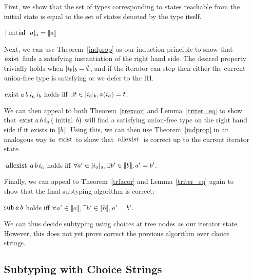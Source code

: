 \documentclass[a4paper,english]{lipics-v2019}
\newcommand{\denotes}[1]{\llbracket #1 \rrbracket}
\renewcommand{\c}[1]{\ensuremath{\text{\lstinline{#1}}}\xspace}
\begin{document}
First, we show that the set of types corresponding to states reachable from
the initial state is equal to the  set of states denoted by the type itself.

\begin{lemma}\label{triter_eq}
$\irch{\c{initial}~a}{a} = \denotes{\c a}$    
\end{lemma}

Next, we can use Theorem~\ref{indprop} as our induction principle to show that
\c{exist} finds a satisfying instantiation of the right hand side. The desired
property trivially holds when $|i_b|_{b} = \emptyset$, and if the iterator can
step then either the current union-free type is satisfying or we defer to the
IH.

\begin{theorem}\label{trexcor}
$\c{exist}\,a\,b\,i_a\,i_b$ holds iff $\exists t\in|i_b|_{b},a(i_a)= t$.
\end{theorem}

We can then appeal to both Theorem~\ref{trexcor} and Lemma~\ref{triter_eq}
to show that $\c{exist}\,a\,b\,i_a\,(\c{initial}\,b)$ will find a satisfying
union-free type on the right hand side if it exists in $\denotes{b}$. Using
this, we can then use Theorem~\ref{indprop} in an analogous way to \c{exist}
to show that \c{allexist} is correct up to the current iterator state.

\begin{theorem}\label{trfacor}
$\c{allexist}\,a\,b\,i_a$ holds iff $\forall a'\in \irch{i_a}{a},
  \exists b'\in \denotes{b}, a'= b'$.
\end{theorem}

Finally, we can appeal to Theorem~\ref{trfacor} and Lemma~\ref{triter_eq}
again to show that the final subtyping algorithm is correct:

\begin{theorem}\label{trsub}
$\c{sub}\,a\,b$ holds iff $\forall a' \in \denotes{a}, \exists b' \in
  \denotes{b}, a' = b'$.
\end{theorem}

We can thus decide subtyping using choices at tree nodes as our iterator
state.  However, this does not yet prove correct the previous algorithm over
choice strings.

\subsection{Subtyping with Choice Strings}
\end{document}
